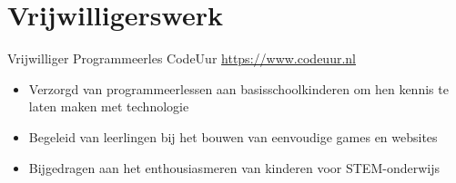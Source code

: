 \documentclass[a4paper, serif, 10pt]{moderncv}
\begin{document}
\section{Vrijwilligerswerk}

        {Vrijwilliger Programmeerles}
        {CodeUur}
        {\url{https://www.codeuur.nl}}
        {}
        {\begin{itemize}
\item Verzorgd van programmeerlessen aan basisschoolkinderen om hen kennis te laten maken met technologie
\item Begeleid van leerlingen bij het bouwen van eenvoudige games en websites
\item Bijgedragen aan het enthousiasmeren van kinderen voor STEM-onderwijs
\end{itemize}}
    
\end{document}
